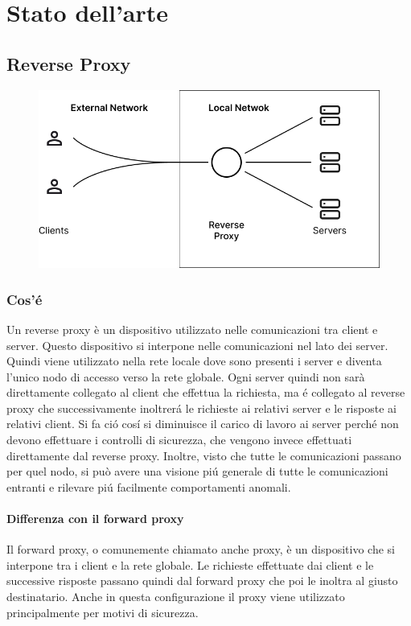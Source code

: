 \chapter{Stato dell'arte}
\label{cha:statoArte}

\section{Reverse Proxy}
\begin{figure}[h!]
  \centering
  \includegraphics[width=.6\textwidth]{images/schema.png}
\end{figure}

\subsection{Cos'é}
Un reverse proxy è un dispositivo utilizzato nelle comunicazioni tra client e server. Questo dispositivo si interpone nelle comunicazioni nel lato dei server. Quindi viene utilizzato nella rete locale dove sono presenti i server e diventa l'unico nodo di accesso verso la rete globale. Ogni server quindi non sarà direttamente collegato al client che effettua la richiesta, ma é collegato al reverse proxy che successivamente inoltrerá le richieste ai relativi server e le risposte ai relativi client. Si fa ció cosí si diminuisce il carico di lavoro ai server perché non devono effettuare i controlli di sicurezza, che vengono invece effettuati direttamente dal reverse proxy. Inoltre, visto che tutte le comunicazioni passano per quel nodo, si può avere una visione piú generale di tutte le comunicazioni entranti e rilevare piú facilmente comportamenti anomali.
\subsubsection{Differenza con il forward proxy}
Il forward proxy, o comunemente chiamato anche proxy, è un dispositivo che si interpone tra i client e la rete globale. Le richieste effettuate dai client e le successive risposte passano quindi dal forward proxy che poi le inoltra al giusto destinatario. Anche in questa configurazione il proxy viene utilizzato principalmente per motivi di sicurezza.

